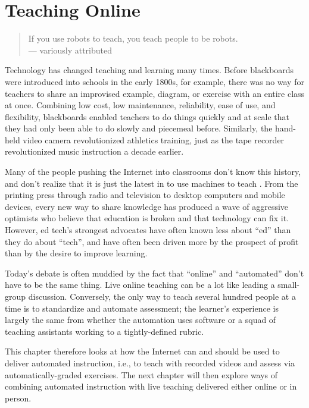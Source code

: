 \chapter{Teaching Online}\label{s:online}

\begin{quote}

  If you use robots to teach, you teach people to be robots. \\
  --- variously attributed

\end{quote}

Technology has changed teaching and learning many times. Before
blackboards were introduced into schools in the early 1800s, for
example, there was no way for teachers to share an improvised example,
diagram, or exercise with an entire class at once. Combining low cost,
low maintenance, reliability, ease of use, and flexibility, blackboards
enabled teachers to do things quickly and at scale that they had only
been able to do slowly and piecemeal before. Similarly, the hand-held
video camera revolutionized athletics training, just as the tape
recorder revolutionized music instruction a decade earlier.

Many of the people pushing the Internet into classrooms don't know
this history, and don't realize that it is just the latest in  to use machines to teach
\cite{Watt2014}. From the printing press through radio and
television to desktop computers and mobile devices, every new way to
share knowledge has produced a wave of aggressive optimists who
believe that education is broken and that technology can fix
it. However, ed tech's strongest advocates have often known less about
``ed'' than they do about ``tech'', and have often been driven more by the
prospect of profit than by the desire to improve learning.

Today's debate is often muddied by the fact that ``online'' and
``automated'' don't have to be the same thing. Live online teaching
can be a lot like leading a small-group discussion. Conversely, the only
way to teach several hundred people at a time is to standardize and
automate assessment; the learner's experience is largely the same from
whether the automation uses software or a squad of teaching assistants
working to a tightly-defined rubric.

This chapter therefore looks at how the Internet can and should be used
to deliver automated instruction, i.e., to teach with recorded videos
and assess via automatically-graded exercises. The next chapter will
then explore ways of combining automated instruction with live teaching
delivered either online or in person.

